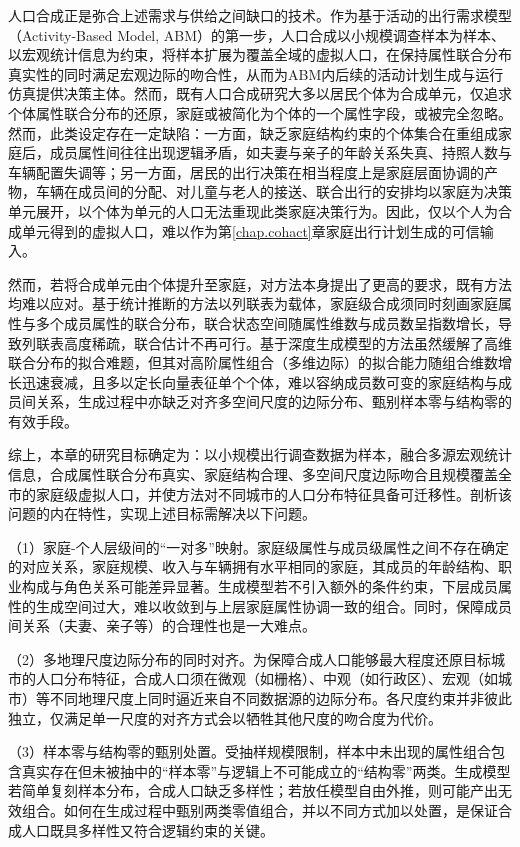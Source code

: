 人口合成正是弥合上述需求与供给之间缺口的技术。作为基于活动的出行需求模型（Activity-Based Model, ABM）的第一步，人口合成以小规模调查样本为样本、以宏观统计信息为约束，将样本扩展为覆盖全域的虚拟人口，在保持属性联合分布真实性的同时满足宏观边际的吻合性，从而为ABM内后续的活动计划生成与运行仿真提供决策主体\cite{laPopulationSynthesisProblembased2025}。然而，既有人口合成研究大多以居民个体为合成单元，仅追求个体属性联合分布的还原，家庭或被简化为个体的一个属性字段，或被完全忽略。然而，此类设定存在一定缺陷：一方面，缺乏家庭结构约束的个体集合在重组成家庭后，成员属性间往往出现逻辑矛盾，如夫妻与亲子的年龄关系失真、持照人数与车辆配置失调等；另一方面，居民的出行决策在相当程度上是家庭层面协调的产物，车辆在成员间的分配、对儿童与老人的接送、联合出行的安排均以家庭为决策单元展开，以个体为单元的人口无法重现此类家庭决策行为。因此，仅以个人为合成单元得到的虚拟人口，难以作为第\ref{chap.cohact}章家庭出行计划生成的可信输入。
 
然而，若将合成单元由个体提升至家庭，对方法本身提出了更高的要求，既有方法均难以应对。基于统计推断的方法以列联表为载体，家庭级合成须同时刻画家庭属性与多个成员属性的联合分布，联合状态空间随属性维数与成员数呈指数增长，导致列联表高度稀疏，联合估计不再可行。基于深度生成模型的方法虽然缓解了高维联合分布的拟合难题，但其对高阶属性组合（多维边际）的拟合能力随组合维数增长迅速衰减，且多以定长向量表征单个个体，难以容纳成员数可变的家庭结构与成员间关系，生成过程中亦缺乏对齐多空间尺度的边际分布、甄别样本零与结构零的有效手段。
 
综上，本章的研究目标确定为：以小规模出行调查数据为样本，融合多源宏观统计信息，合成属性联合分布真实、家庭结构合理、多空间尺度边际吻合且规模覆盖全市的家庭级虚拟人口，并使方法对不同城市的人口分布特征具备可迁移性。剖析该问题的内在特性，实现上述目标需解决以下问题。
 
（1）家庭-个人层级间的``一对多''映射。家庭级属性与成员级属性之间不存在确定的对应关系，家庭规模、收入与车辆拥有水平相同的家庭，其成员的年龄结构、职业构成与角色关系可能差异显著。生成模型若不引入额外的条件约束，下层成员属性的生成空间过大，难以收敛到与上层家庭属性协调一致的组合。同时，保障成员间关系（夫妻、亲子等）的合理性也是一大难点。
 
（2）多地理尺度边际分布的同时对齐。为保障合成人口能够最大程度还原目标城市的人口分布特征，合成人口须在微观（如栅格）、中观（如行政区）、宏观（如城市）等不同地理尺度上同时逼近来自不同数据源的边际分布。各尺度约束并非彼此独立，仅满足单一尺度的对齐方式会以牺牲其他尺度的吻合度为代价。
 
（3）样本零与结构零的甄别处置。受抽样规模限制，样本中未出现的属性组合包含真实存在但未被抽中的``样本零''与逻辑上不可能成立的``结构零''两类。生成模型若简单复刻样本分布，合成人口缺乏多样性；若放任模型自由外推，则可能产出无效组合。如何在生成过程中甄别两类零值组合，并以不同方式加以处置，是保证合成人口既具多样性又符合逻辑约束的关键。
 
